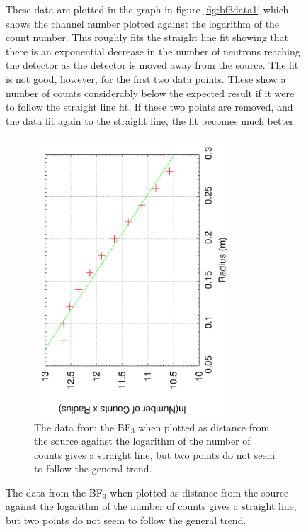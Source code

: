 \begin{figure}[ht]
These data are plotted in the graph in figure \ref{fig:bf3data1} which shows the channel number plotted against the logarithm of the count number. This roughly fits the straight line fit showing that there is an exponential decrease in the number of neutrons reaching the detector as the detector is moved away from the source. The fit is not good, however, for the first two data points. These show a number of counts considerably below the expected result if it were to follow the straight line fit. If these two points are removed, and the data fit again to the straight line, the fit becomes much better. 
\begin{figure}[ht]
  \centering
  \includegraphics[width=0.8\textwidth]{BF3data1.pdf}
  \caption{The data from the BF$_3$ when plotted as distance from the source against the logarithm of the number of counts gives a straight line, but two points do not seem to follow the general trend. \label{fig:bf3errorest}}
\end{figure}


\end{figure}
